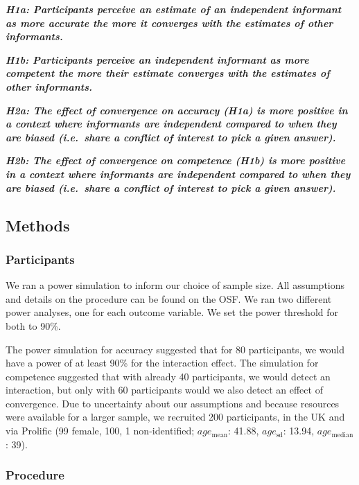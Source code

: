 \documentclass[
  doc,floatsintext]{apa6}
\begin{document}
\textbf{\emph{H1a: Participants perceive an estimate of an independent informant as more accurate the more it converges with the estimates of other informants.}}

\textbf{\emph{H1b: Participants perceive an independent informant as more competent the more their estimate converges with the estimates of other informants.}}

\textbf{\emph{H2a: The effect of convergence on accuracy (H1a) is more positive in a context where informants are independent compared to when they are biased (i.e.~share a conflict of interest to pick a given answer).}}

\textbf{\emph{H2b: The effect of convergence on competence (H1b) is more positive in a context where informants are independent compared to when they are biased (i.e.~share a conflict of interest to pick a given answer).}}

\subsection{Methods}\label{methods-4}

\subsubsection{Participants}\label{participants-4}

We ran a power simulation to inform our choice of sample size. All assumptions and details on the procedure can be found on the OSF. We ran two different power analyses, one for each outcome variable. We set the power threshold for both to 90\%.

The power simulation for accuracy suggested that for 80 participants, we would have a power of at least 90\% for the interaction effect. The simulation for competence suggested that with already 40 participants, we would detect an interaction, but only with 60 participants would we also detect an effect of convergence. Due to uncertainty about our assumptions and because resources were available for a larger sample, we recruited 200 participants, in the UK and via Prolific (99 female, 100, 1 non-identified; \(age_\text{mean}\): 41.88, \(age_\text{sd}\): 13.94, \(age_\text{median}\): 39).

\subsubsection{Procedure}\label{procedure-3}
\end{document}
